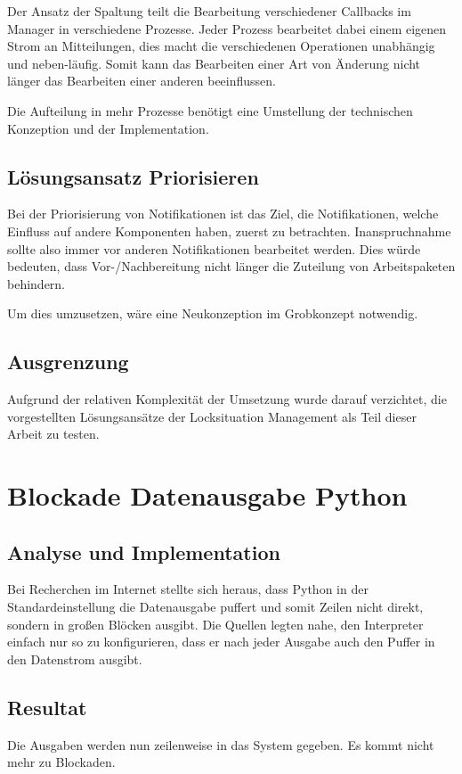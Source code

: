 Der Ansatz der Spaltung teilt die Bearbeitung verschiedener Callbacks im Manager
in verschiedene Prozesse. Jeder Prozess bearbeitet dabei einem eigenen Strom an Mitteilungen, dies macht die verschiedenen Operationen unabhängig und neben-läufig.
Somit kann das Bearbeiten einer Art von Änderung nicht länger das Bearbeiten einer anderen beeinflussen.

Die Aufteilung in mehr Prozesse benötigt eine Umstellung der technischen Konzeption und der Implementation.

\subsection{Lösungsansatz Priorisieren}

Bei der Priorisierung von Notifikationen ist das Ziel,
die Notifikationen, welche Einfluss auf andere Komponenten haben, zuerst zu betrachten.
Inanspruchnahme sollte also immer vor anderen Notifikationen bearbeitet werden.
Dies würde bedeuten, dass Vor-/Nachbereitung nicht länger die Zuteilung von Arbeitspaketen behindern.

Um dies umzusetzen, wäre eine Neukonzeption im Grobkonzept notwendig.


\subsection{Ausgrenzung}

Aufgrund der relativen Komplexität der Umsetzung
wurde darauf verzichtet, die vorgestellten Lösungsansätze der Locksituation Management
als Teil dieser Arbeit zu testen.

\section{Blockade Datenausgabe Python}
\subsection{Analyse und Implementation}

Bei Recherchen im Internet stellte sich heraus,
dass Python in der Standardeinstellung die Datenausgabe puffert und somit Zeilen nicht direkt,
sondern in großen Blöcken ausgibt.
Die Quellen legten nahe, den Interpreter einfach nur so zu konfigurieren,
dass er nach jeder Ausgabe auch den Puffer in den Datenstrom ausgibt.

\subsection{Resultat}

Die Ausgaben werden nun zeilenweise in das System gegeben.
Es kommt nicht mehr zu Blockaden.
